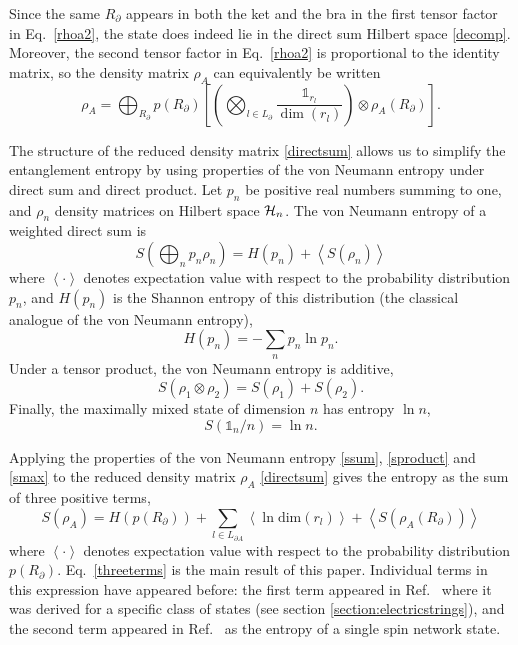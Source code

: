 \documentclass[aps,prd,twocolumn,showpacs,groupedaddress,nofootinbib,letterpaper]{revtex4}
\newcommand{\avg}[1]{\left\langle#1\right\rangle}
\begin{document}
Since the same $R_{\partial}$ appears in both the ket and the bra in the first tensor factor in Eq.~\eqref{rhoa2}, the state does indeed lie in the direct sum Hilbert space \eqref{decomp}.
Moreover, the second tensor factor in Eq.~\eqref{rhoa2} is proportional to the identity matrix, so the density matrix $\rho_A$ can equivalently be written
\begin{equation} \label{directsum}
\rho_A = \bigoplus_{R_{\partial}} p(R_{\partial}) \left[ 
\left( \bigotimes_{l \in L_{\partial}} \frac{\mathbb{1}_{r_l}}{\dim(r_l)} \right)
\otimes \rho_A(R_{\partial})
 \right].
\end{equation}

The structure of the reduced density matrix \eqref{directsum} allows us to simplify the entanglement entropy by using properties of the von Neumann entropy under direct sum and direct product.
Let $p_n$ be positive real numbers summing to one, and $\rho_n$ density matrices on Hilbert space ${\cal H}_n$.
The von Neumann entropy of a weighted direct sum is
\begin{equation} \label{ssum}
S \left( \bigoplus_n p_n \rho_n \right) = H(p_n) + \avg{ S(\rho_n) }
\end{equation}
where $\avg{\cdot}$ denotes expectation value with respect to the probability distribution $p_n$, and $H(p_n)$ is the Shannon entropy of this distribution (the classical analogue of the von Neumann entropy),
\begin{equation}
H(p_n) = -\sum_n p_n \ln p_n.
\end{equation}
Under a tensor product, the von Neumann entropy is additive,
\begin{equation} \label{sproduct}
S(\rho_1 \otimes \rho_2) = S(\rho_1) + S(\rho_2).
\end{equation}
Finally, the maximally mixed state of dimension $n$ has entropy $\ln n$,
\begin{equation} \label{smax}
S( \mathbb{1}_n / n) = \ln n.
\end{equation}

Applying the properties of the von Neumann entropy \eqref{ssum}, \eqref{sproduct} and \eqref{smax} to the reduced density matrix $\rho_A$ \eqref{directsum} gives the entropy as the sum of three positive terms,
\begin{equation} \label{threeterms}
S(\rho_A) = H(p(R_{\partial})) + \sum_{l \in L_{\partial A}} \!\!\! \avg{\ln \text{dim}(r_l)} + \avg{S(\rho_A(R_{\partial}))}
\end{equation}
where $\avg{\cdot}$ denotes expectation value with respect to the probability distribution $p(R_{\partial})$.
Eq.~\eqref{threeterms} is the main result of this paper.
Individual terms in this expression have appeared before: the first term appeared in Ref.~\cite{Buividovich2008b} where it was derived for a specific class of states (see section \ref{section:electricstrings}), and the second term appeared in Ref.~\cite{Donnelly2008} as the entropy of a single spin network state.
\end{document}
